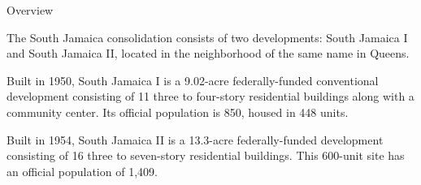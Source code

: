 Overview 

The South Jamaica consolidation consists of two developments: South Jamaica I and South Jamaica II, located in the neighborhood of the same name in Queens. 

Built in 1950, South Jamaica I is a 9.02-acre federally-funded conventional development consisting of 11 three to four-story residential buildings along with a community center. Its official population is 850, housed in 448 units. 

Built in 1954, South Jamaica II is a 13.3-acre federally-funded development consisting of 16 three to seven-story residential buildings. This 600-unit site has an official population of 1,409.